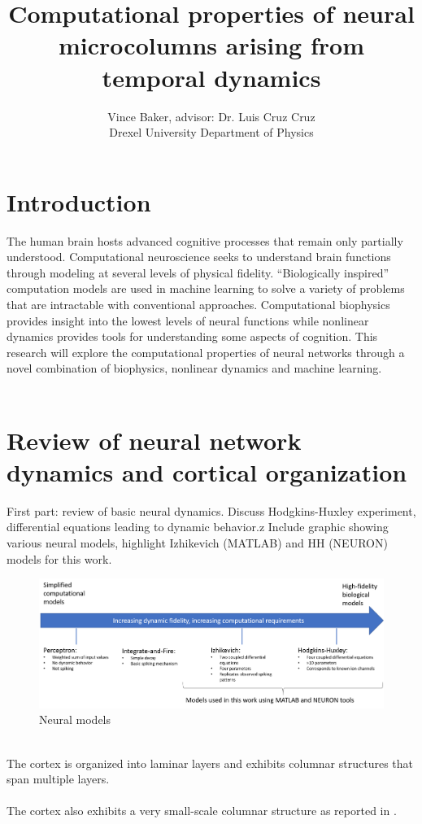 \documentclass[a4paper,11pt]{article}
\title{Computational properties of neural microcolumns arising from temporal dynamics}
\author{Vince Baker, advisor: Dr. Luis Cruz Cruz\\ Drexel University Department of Physics}
\numberwithin{equation}{section}
\begin{document}
\maketitle

\section{Introduction} 
The human brain hosts advanced cognitive processes that remain only partially understood.
Computational neuroscience seeks to understand brain functions through modeling at several levels of physical fidelity.
``Biologically inspired'' computation models are used in machine learning to solve a variety of problems that are intractable with conventional approaches.
Computational biophysics provides insight into the lowest levels of neural functions while nonlinear dynamics provides tools for understanding some aspects of cognition.
This research will explore the computational properties of neural networks through a novel combination of biophysics, nonlinear dynamics and machine learning.
\\ \\
\section{Review of neural network dynamics and cortical organization}
First part: review of basic neural dynamics.
Discuss Hodgkins-Huxley experiment, differential equations leading to dynamic behavior.z
Include graphic showing various neural models, highlight Izhikevich \cite{izhikevich2003} (MATLAB) and HH (NEURON) models for this work.
\begin{figure}
 \caption{Neural models}
 \centering
   \includegraphics[width=\textwidth]{fig/neural_models}
\end{figure}\\
The cortex is organized into laminar layers and exhibits columnar structures that span multiple layers. \\ \\
The cortex also exhibits a very small-scale columnar structure as reported in \cite{cruz2000}\cite{cruz2009}. \\ \\
\\ \\
\end{document}
